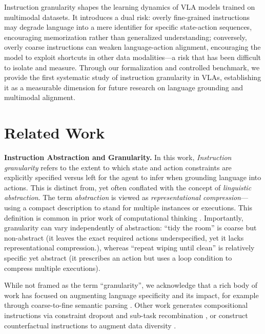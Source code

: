 \documentclass{article}
\begin{document}
Instruction granularity shapes the learning dynamics of VLA models trained on multimodal datasets. It introduces a dual risk: overly fine-grained instructions may degrade language into a mere identifier for specific state-action sequences, encouraging memorization rather than generalized understanding; conversely, overly coarse instructions can weaken language-action alignment, encouraging the model to exploit shortcuts in other data modalities---a risk that has been difficult to isolate and measure. Through our formalization and controlled benchmark, we provide the first systematic study of instruction granularity in VLAs, establishing it as a measurable dimension for future research on language grounding and multimodal alignment.


\section{Related Work}
\label{sec:related_work}

\textbf{Instruction Abstraction and Granularity.}
In this work, \emph{Instruction granularity} refers to the extent to which state and action constraints are explicitly specified versus left for the agent to infer when grounding language into actions.
This is distinct from, yet often conflated with the concept of \emph{linguistic abstraction}.
The term \emph{abstraction} is viewed as \emph{representational compression}---using a compact description to stand for multiple instances or executions. This definition is common in prior work of computational thinking \cite{Wing2010ComputationalTW,DBLP:journals/tacl/LachmyPMT22,DBLP:conf/iclr/ZhengMCCCLZ24}.
Importantly, granularity can vary independently of abstraction: ``tidy the room'' is coarse but non-abstract (it leaves the exact required actions underspecified, yet it lacks representational compression.), whereas ``repeat wiping until clean'' is relatively specific yet abstract (it prescribes an action but uses a loop condition to compress multiple executions).

While not framed as the term ``granularity'', we acknowledge that a rich body of work has focused on augmenting language specificity and its impact, for example through coarse-to-fine semantic parsing \cite{dong-lapata-2018-coarse,DBLP:conf/ijcai/LiLF020}.
Other work generates compositional instructions via constraint dropout and sub-task recombination \cite{huang-etal-2025-musc}, or construct counterfactual instructions to augment data diversity \cite{glossop2025castcounterfactuallabelsimprove}.
\end{document}
